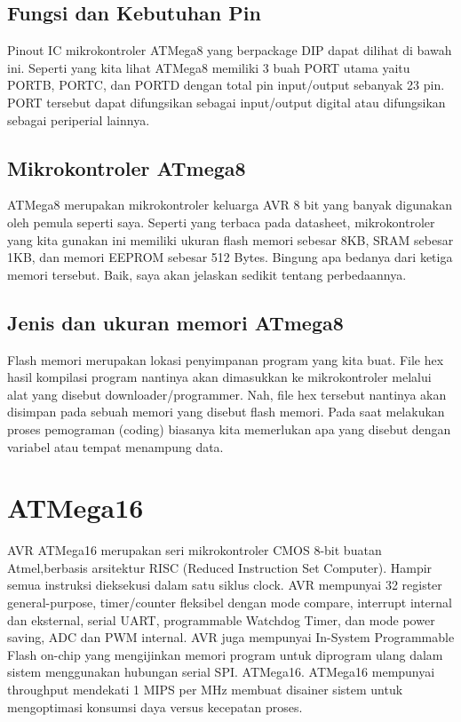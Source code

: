 	\subsection{Fungsi dan Kebutuhan Pin}
		Pinout IC mikrokontroler ATMega8 yang berpackage DIP dapat dilihat di bawah ini.
		Seperti yang kita lihat ATMega8 memiliki 3 buah PORT utama yaitu PORTB, PORTC, dan PORTD dengan total pin input/output sebanyak 23 pin. PORT tersebut dapat difungsikan sebagai input/output digital atau difungsikan sebagai periperial lainnya.
		
	\subsection{Mikrokontroler ATmega8}
		ATMega8 merupakan mikrokontroler keluarga AVR 8 bit yang banyak digunakan oleh pemula seperti saya. Seperti yang terbaca pada datasheet, mikrokontroler yang kita gunakan ini memiliki ukuran flash memori sebesar 8KB, SRAM sebesar 1KB, dan memori EEPROM sebesar 512 Bytes. Bingung apa bedanya dari ketiga memori tersebut. Baik, saya akan jelaskan sedikit tentang perbedaannya.
	\subsection{Jenis dan ukuran memori ATmega8}
		Flash memori merupakan lokasi penyimpanan program yang kita buat. File hex hasil kompilasi program nantinya akan dimasukkan ke mikrokontroler melalui alat yang disebut downloader/programmer. Nah, file hex tersebut nantinya akan disimpan pada sebuah memori yang disebut flash memori. Pada saat melakukan proses pemograman (coding) biasanya kita memerlukan apa yang disebut dengan variabel atau tempat menampung data.
		
\section{ATMega16}
		AVR ATMega16 merupakan seri mikrokontroler CMOS 8-bit buatan Atmel,berbasis arsitektur RISC (Reduced Instruction Set Computer). Hampir semua instruksi dieksekusi dalam satu siklus clock. AVR mempunyai 32 register general-purpose, timer/counter fleksibel dengan mode compare, interrupt internal dan eksternal, serial UART, programmable Watchdog Timer, dan mode power saving, ADC dan PWM internal. AVR juga mempunyai In-System Programmable Flash on-chip yang mengijinkan memori program untuk diprogram ulang dalam sistem menggunakan hubungan serial SPI. ATMega16. ATMega16 mempunyai throughput mendekati 1 MIPS per MHz membuat disainer sistem untuk mengoptimasi konsumsi daya versus kecepatan proses.
